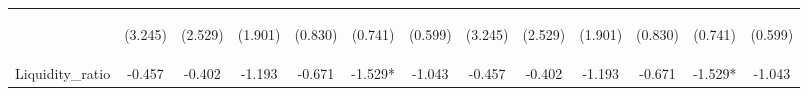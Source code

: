 \documentclass[]{article}
\begin{document}
\begin{center}
\begin{tabular}{lcccccccccccc}
\vspace{4pt} & \begin{footnotesize}(3.245)\end{footnotesize} & \begin{footnotesize}(2.529)\end{footnotesize} & \begin{footnotesize}(1.901)\end{footnotesize} & \begin{footnotesize}(0.830)\end{footnotesize} & \begin{footnotesize}(0.741)\end{footnotesize} & \begin{footnotesize}(0.599)\end{footnotesize} & \begin{footnotesize}(3.245)\end{footnotesize} & \begin{footnotesize}(2.529)\end{footnotesize} & \begin{footnotesize}(1.901)\end{footnotesize} & \begin{footnotesize}(0.830)\end{footnotesize} & \begin{footnotesize}(0.741)\end{footnotesize} & \begin{footnotesize}(0.599)\end{footnotesize} \\
Liquidity\_ratio & -0.457 & -0.402 & -1.193 & -0.671 & -1.529* & -1.043 & -0.457 & -0.402 & -1.193 & -0.671 & -1.529* & -1.043 \\

\end{tabular}
\end{center}
\end{document}
